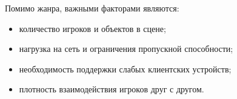 Помимо жанра, важными факторами являются:

\begin{itemize}
    \item количество игроков и объектов в сцене;
    \item нагрузка на сеть и ограничения пропускной способности;
    \item необходимость поддержки слабых клиентских устройств;
    \item плотность взаимодействия игроков друг с другом.
\end{itemize}
